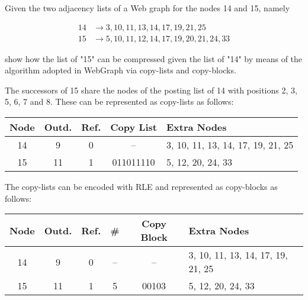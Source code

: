 \exercise

Given the two adjacency lists of a Web graph for the nodes 14 and 15, namely

\begin{align*}
	14 &\rightarrow 3, 10, 11, 13, 14, 17, 19, 21, 25 \\
	15 &\rightarrow 5, 10, 11, 12, 14, 17, 19, 20, 21, 24, 33
\end{align*}

show how the list of "15" can be compressed given the list of "14" by means of
the algorithm adopted in WebGraph via copy-lists and copy-blocks.

\solution

The successors of 15 share the nodes of the posting list of 14 with positions 2,
3, 5, 6, 7 and 8. These can be represented as copy-lists as follows:
%
\begin{longtable}{|c|c|c|c|l|}
  \hline
  Node & Outd. & Ref. & Copy List & Extra Nodes \\ \hline
  14 & 9  & 0 & --        & 3, 10, 11, 13, 14, 17, 19, 21, 25 \\
  15 & 11 & 1 & 011011110 & 5, 12, 20, 24, 33 \\ \hline
\end{longtable}
%
The copy-lists can be encoded with RLE and represented as copy-blocks as
follows:
%
\begin{longtable}{|c|c|c|c|c|l|}
  \hline
  Node & Outd. & Ref. & \# & Copy Block & Extra Nodes \\ \hline
  14 & 9  & 0 & -- & --    & 3, 10, 11, 13, 14, 17, 19, 21, 25 \\
  15 & 11 & 1 & 5  & 00103 & 5, 12, 20, 24, 33 \\ \hline
\end{longtable}
